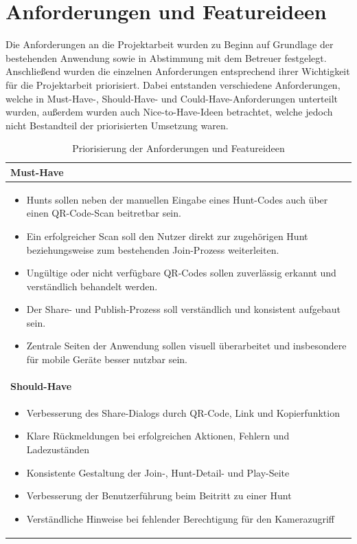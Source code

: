 ﻿\documentclass[oneside]{ausarbeitung}
\begin{document}
\section{Anforderungen und Featureideen}
\label{sec:anforderungen}

Die Anforderungen an die Projektarbeit wurden zu Beginn auf Grundlage der bestehenden Anwendung sowie in Abstimmung mit dem Betreuer festgelegt. Anschließend wurden 
die einzelnen Anforderungen entsprechend ihrer Wichtigkeit für die Projektarbeit priorisiert. Dabei entstanden verschiedene Anforderungen, welche in Must-Have-,
Should-Have- und Could-Have-Anforderungen unterteilt wurden, außerdem wurden auch Nice-to-Have-Ideen betrachtet, welche jedoch nicht Bestandteil der priorisierten
Umsetzung waren. 


\begin{longtable}{|p{\dimexpr\textwidth-2\tabcolsep-2\arrayrulewidth\relax}|}
\caption{Priorisierung der Anforderungen und Featureideen}
\label{tab:anforderungen}\\
\hline

\textbf{Must-Have} \\ \hline

\begin{itemize}
    \item Hunts sollen neben der manuellen Eingabe eines Hunt-Codes auch über einen QR-Code-Scan beitretbar sein.
    \item Ein erfolgreicher Scan soll den Nutzer direkt zur zugehörigen Hunt beziehungsweise zum bestehenden Join-Prozess weiterleiten.
    \item Ungültige oder nicht verfügbare QR-Codes sollen zuverlässig erkannt und verständlich behandelt werden.
    \item Der Share- und Publish-Prozess soll verständlich und konsistent aufgebaut sein.
    \item Zentrale Seiten der Anwendung sollen visuell überarbeitet und insbesondere für mobile Geräte besser nutzbar sein.
\end{itemize}
\\ \hline

\textbf{Should-Have} \\ \hline

\begin{itemize}
    \item Verbesserung des Share-Dialogs durch QR-Code, Link und Kopierfunktion
    \item Klare Rückmeldungen bei erfolgreichen Aktionen, Fehlern und Ladezuständen
    \item Konsistente Gestaltung der Join-, Hunt-Detail- und Play-Seite
    \item Verbesserung der Benutzerführung beim Beitritt zu einer Hunt
    \item Verständliche Hinweise bei fehlender Berechtigung für den Kamerazugriff
\end{itemize}
\\ \hline


\end{longtable}
\end{document}
